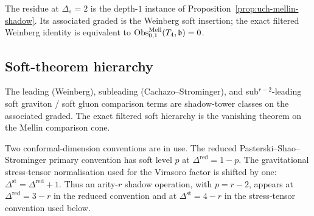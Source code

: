 \begin{remark}
\label{rem:uch-weinberg-identification}
The residue at $\Delta_s=2$ is the depth-$1$ instance of
Proposition~\ref{prop:uch-mellin-shadow}. Its associated graded is the
Weinberg soft insertion; the exact filtered Weinberg identity is
equivalent to
$\operatorname{Obs}^{\mathrm{Mell}}_{0,1}(T_4,\mathfrak b)=0$.
\end{remark}

\subsection{Soft-theorem hierarchy}
\label{subsec:uch-soft}

The leading (Weinberg), subleading (Cachazo--Strominger), and
sub${}^{r-2}$-leading soft graviton /
soft gluon comparison terms are shadow-tower classes on the associated
graded. The exact filtered soft hierarchy is the vanishing theorem on
the Mellin comparison cone.

Two conformal-dimension conventions are in use. The reduced
Pasterski--Shao--Strominger primary convention has soft level $p$ at
$\Delta^{\mathrm{red}}=1-p$. The gravitational stress-tensor
normalisation used for the Virasoro factor is shifted by one:
$\Delta^{\mathrm{st}}=\Delta^{\mathrm{red}}+1$. Thus an arity-$r$
shadow operation, with $p=r-2$, appears at
$\Delta^{\mathrm{red}}=3-r$ in the reduced convention and at
$\Delta^{\mathrm{st}}=4-r$ in the stress-tensor convention used below.


